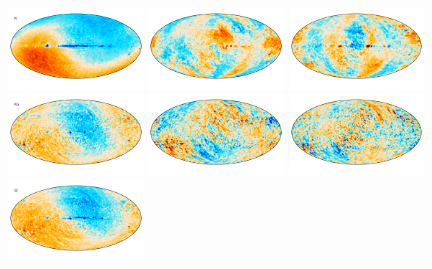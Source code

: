 \documentclass[twocolumn]{../../common/aa}
\begin{document}
\begin{figure}
	\centering
	\includegraphics[width=0.32\textwidth]{figures/megadiff_K_I.pdf}
        \includegraphics[width=0.32\textwidth]{figures/megadiff_K_Q.pdf}
        \includegraphics[width=0.32\textwidth]{figures/megadiff_K_U.pdf}\\\vspace*{-4mm}
	\includegraphics[width=0.32\textwidth]{figures/megadiff_Ka_I.pdf}
        \includegraphics[width=0.32\textwidth]{figures/megadiff_Ka_Q.pdf}
        \includegraphics[width=0.32\textwidth]{figures/megadiff_Ka_U.pdf}\\\vspace*{-4mm}
	\includegraphics[width=0.32\textwidth]{figures/megadiff_Q_I.pdf}

\end{figure}
\end{document}
